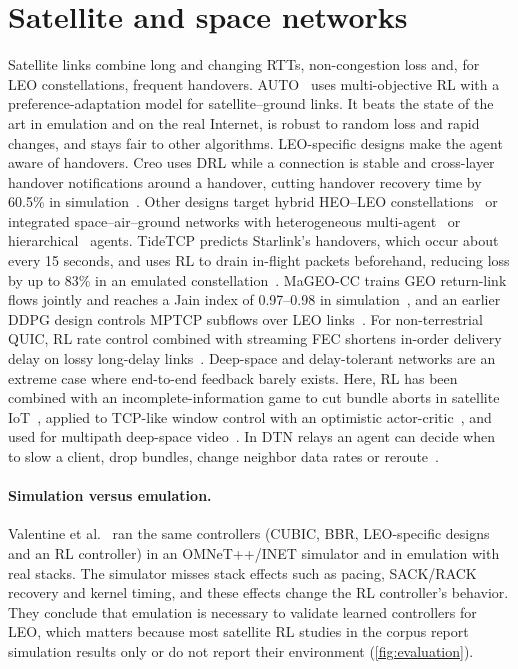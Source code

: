 \section{Satellite and space networks}
\label{sec:satellite}

Satellite links combine long and changing RTTs, non-congestion loss and, for LEO constellations, frequent handovers. AUTO~\cite{li2021auto} uses multi-objective RL with a preference-adaptation model for satellite--ground links. It beats the state of the art in emulation and on the real Internet, is robust to random loss and rapid changes, and stays fair to other algorithms. LEO-specific designs make the agent aware of handovers. Creo uses DRL while a connection is stable and cross-layer handover notifications around a handover, cutting handover recovery time by 60.5\% in simulation~\cite{yan2025handover}. Other designs target hybrid HEO--LEO constellations~\cite{liu2025intelligent} or integrated space--air--ground networks with heterogeneous multi-agent~\cite{gui2025multi} or hierarchical~\cite{lv2026qos} agents. TideTCP predicts Starlink's handovers, which occur about every 15 seconds, and uses RL to drain in-flight packets beforehand, reducing loss by up to 83\% in an emulated constellation~\cite{li2026tidetcp}. MaGEO-CC trains GEO return-link flows jointly and reaches a Jain index of 0.97--0.98 in simulation~\cite{yu2026multi}, and an earlier DDPG design controls MPTCP subflows over LEO links~\cite{mai2019self}. For non-terrestrial QUIC, RL rate control combined with streaming FEC shortens in-order delivery delay on lossy long-delay links~\cite{yu2023low}. Deep-space and delay-tolerant networks are an extreme case where end-to-end feedback barely exists. Here, RL has been combined with an incomplete-information game to cut bundle aborts in satellite IoT~\cite{wang2019reinforcement}, applied to TCP-like window control with an optimistic actor-critic~\cite{masood2022intelligent}, and used for multipath deep-space video~\cite{ha2023intelligent}. In DTN relays an agent can decide when to slow a client, drop bundles, change neighbor data rates or reroute~\cite{harkavy2020utilizing,buzzi2021autonomous,buzzi2021deep,sun2022reinforcement}.

\paragraph{Simulation versus emulation.} Valentine et al.~\cite{valentine2026emulation} ran the same controllers (CUBIC, BBR, LEO-specific designs and an RL controller) in an OMNeT++/INET simulator and in emulation with real stacks. The simulator misses stack effects such as pacing, SACK/RACK recovery and kernel timing, and these effects change the RL controller's behavior. They conclude that emulation is necessary to validate learned controllers for LEO, which matters because most satellite RL studies in the corpus report simulation results only or do not report their environment (\cref{fig:evaluation}).

